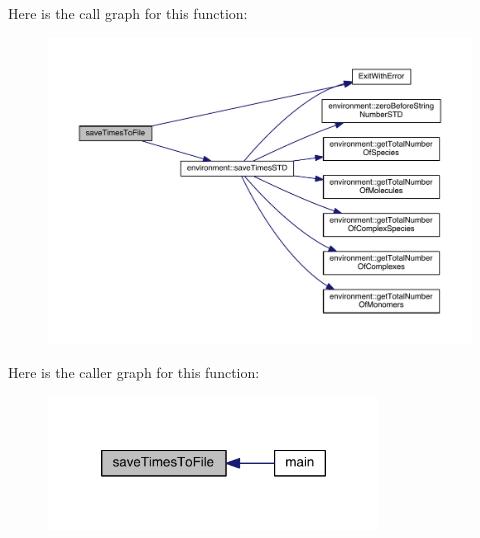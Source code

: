 Here is the call graph for this function\+:\nopagebreak
\begin{figure}[H]
\begin{center}
\leavevmode
\includegraphics[width=350pt]{a00068_a2bf310904bc4e1fb5669e548525c4ba7_cgraph}
\end{center}
\end{figure}




Here is the caller graph for this function\+:\nopagebreak
\begin{figure}[H]
\begin{center}
\leavevmode
\includegraphics[width=248pt]{a00068_a2bf310904bc4e1fb5669e548525c4ba7_icgraph}
\end{center}
\end{figure}


